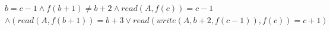 \begin{align*}
%
& %
b = c - 1
%
\land
%
f(b + 1)  \neq  b + 2
%
\land
%
\mathit{read}(A,f(c)) = c - 1
~\\~
& %
%
\land
%
(\mathit{read}(A,f(b + 1)) = b + 3 \lor \mathit{read}(\mathit{write}(A,b + 2,f(c - 1)),f(c)) = c + 1)
%
\end{align*}
